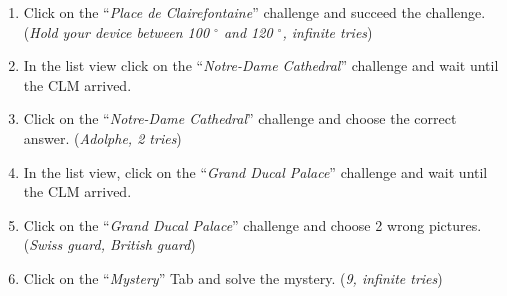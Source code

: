 \begin{enumerate}
	\item Click on the ``\emph{Place de Clairefontaine}'' challenge and succeed the challenge. (\emph{Hold your device between 100 $^{\circ}$ and 120 $^{\circ}$, infinite tries})
	\item In the list view click on the ``\emph{Notre-Dame Cathedral}'' challenge and wait until the CLM arrived.
	\item Click on the ``\emph{Notre-Dame Cathedral}'' challenge and choose the correct answer. (\emph{Adolphe, 2 tries})
	\item In the list view, click on the ``\emph{Grand Ducal Palace}'' challenge and wait until the CLM arrived.
	\item Click on the ``\emph{Grand Ducal Palace}'' challenge and choose 2 wrong pictures. (\emph{Swiss guard, British guard})
	\item Click on the ``\emph{Mystery}'' Tab and solve the mystery. (\emph{9, infinite tries})
\end{enumerate}

